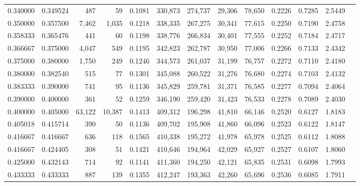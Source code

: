 \begin{tabular}{rrrrrrrrrrrrr}
0.340000 & 0.349524 &    487 &     59 &                                     0.1081 & 330,873 & 274,737 &  29,306 &  78,650 & 0.2226 & 0.7285 & 2.5449 \\
0.350000 & 0.357500 &  7,462 &  1,035 &                                     0.1218 & 338,335 & 267,275 &  30,341 &  77,615 & 0.2250 & 0.7190 & 2.4758 \\
0.358333 & 0.365476 &    441 &     60 &                                     0.1198 & 338,776 & 266,834 &  30,401 &  77,555 & 0.2252 & 0.7184 & 2.4717 \\
0.366667 & 0.375000 &  4,047 &    549 &                                     0.1195 & 342,823 & 262,787 &  30,950 &  77,006 & 0.2266 & 0.7133 & 2.4342 \\
0.375000 & 0.380000 &  1,750 &    249 &                                     0.1246 & 344,573 & 261,037 &  31,199 &  76,757 & 0.2272 & 0.7110 & 2.4180 \\
0.380000 & 0.382540 &    515 &     77 &                                     0.1301 & 345,088 & 260,522 &  31,276 &  76,680 & 0.2274 & 0.7103 & 2.4132 \\
0.383333 & 0.390000 &    741 &     95 &                                     0.1136 & 345,829 & 259,781 &  31,371 &  76,585 & 0.2277 & 0.7094 & 2.4064 \\
0.390000 & 0.400000 &    361 &     52 &                                     0.1259 & 346,190 & 259,420 &  31,423 &  76,533 & 0.2278 & 0.7089 & 2.4030 \\
0.400000 & 0.405000 & 63,122 & 10,387 &                                     0.1413 & 409,312 & 196,298 &  41,810 &  66,146 & 0.2520 & 0.6127 & 1.8183 \\
0.405018 & 0.415714 &    390 &     50 &                                     0.1136 & 409,702 & 195,908 &  41,860 &  66,096 & 0.2523 & 0.6122 & 1.8147 \\
0.416667 & 0.416667 &    636 &    118 &                                     0.1565 & 410,338 & 195,272 &  41,978 &  65,978 & 0.2525 & 0.6112 & 1.8088 \\
0.416667 & 0.424405 &    308 &     51 &                                     0.1421 & 410,646 & 194,964 &  42,029 &  65,927 & 0.2527 & 0.6107 & 1.8060 \\
0.425000 & 0.432143 &    714 &     92 &                                     0.1141 & 411,360 & 194,250 &  42,121 &  65,835 & 0.2531 & 0.6098 & 1.7993 \\
0.433333 & 0.433333 &    887 &    139 &                                     0.1355 & 412,247 & 193,363 &  42,260 &  65,696 & 0.2536 & 0.6085 & 1.7911 \\

\end{tabular}
